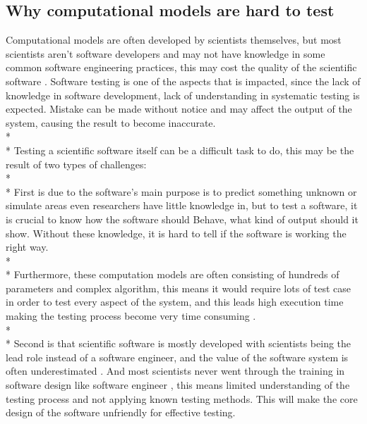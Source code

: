 \subsection{Why computational models are hard to test}
Computational models are often developed by scientists themselves, but most scientists aren’t software developers and may not have knowledge in some common software engineering practices, this may cost the quality of the scientific software \cite{Reference6}. Software testing is one of the aspects that is impacted, since the lack of knowledge in software development, lack of understanding in systematic testing is expected. Mistake can be made without notice and may affect the output of the system, causing the result to become inaccurate.\\*\\*
Testing a scientific software itself can be a difficult task to do, this may be the result of two types of challenges: \\*\\*
First is due to the software’s main purpose is to predict something unknown or simulate areas even researchers have little knowledge in, but to test a software, it is crucial to know how the software should Behave, what kind of output should it show. 
Without these knowledge, it is hard to tell if the software is working the right way. \\*\\*
Furthermore, these computation models are often consisting of hundreds of parameters and complex algorithm, this means it would require lots of test case in order to test every aspect of the system, and this leads high execution time making the testing process become very time consuming \cite{Reference6}.\\*\\*
Second is that scientific software is mostly developed with scientists being the lead role instead of a software engineer, and the value of the software system is often underestimated \cite{Reference6}. And most scientists never went through the training in software design like software engineer \cite{Reference7}, this means limited understanding of the testing process and not applying known testing methods. This will make the core design of the software unfriendly for effective testing.

